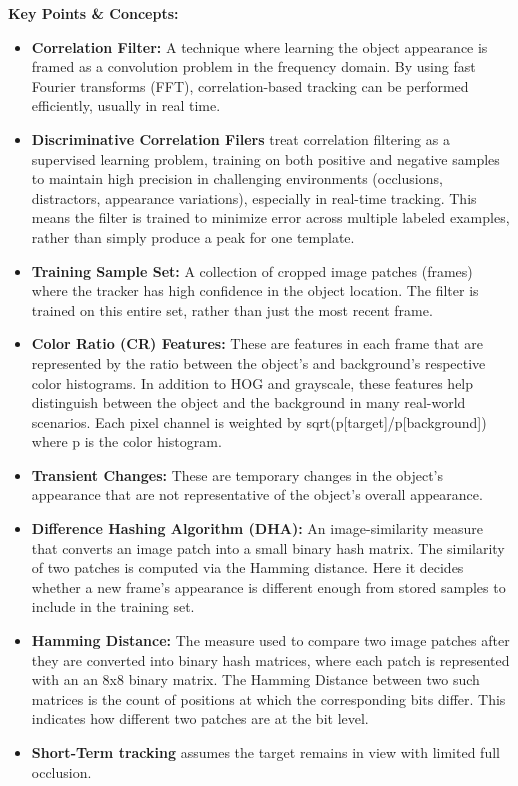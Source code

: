 \documentclass{article}
\begin{document}
\textbf{Key Points \& Concepts:}
\begin{itemize}
  \item \textbf{Correlation Filter:} A technique where learning the object appearance is framed as a convolution problem in the frequency domain. By using fast Fourier transforms (FFT), correlation-based tracking can be performed efficiently, usually in real time.
  \item \textbf{Discriminative Correlation Filers} treat correlation filtering as a supervised learning problem, training on both positive and negative samples to maintain high precision in challenging environments (occlusions, distractors, appearance variations), especially in real-time tracking. This means the filter is trained to minimize error across multiple labeled examples, rather than simply produce a peak for one template.
  \item \textbf{Training Sample Set:} A collection of cropped image patches (frames) where the tracker has high confidence in the object location. The filter is trained on this entire set, rather than just the most recent frame.
  \item \textbf{Color Ratio (CR) Features:} These are features in each frame that are represented by the ratio between the object's and background's respective color histograms. In addition to HOG and grayscale, these features help distinguish between the object and the background in many real-world scenarios. Each pixel channel is weighted by sqrt(p[target]/p[background]) where p is the color histogram.
  \item \textbf{Transient Changes:} These are temporary changes in the object's appearance that are not representative of the object's overall appearance.
  \item \textbf{Difference Hashing Algorithm (DHA):} An image-similarity measure that converts an image patch into a small binary hash matrix. The similarity of two patches is computed via the Hamming distance. Here it decides whether a new frame's appearance is different enough from stored samples to include in the training set.
  \item \textbf{Hamming Distance:} The measure used to compare two image patches after they are converted into binary hash matrices, where each patch is represented with an an 8x8 binary matrix. The Hamming Distance between two such matrices is the count of positions at which the corresponding bits differ. This indicates how different two patches are at the bit level.
  \item \textbf{Short-Term tracking} assumes the target remains in view with limited full occlusion.

\end{itemize}
\end{document}
